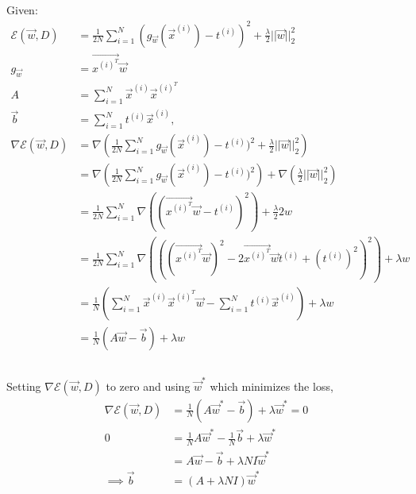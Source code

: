 \documentclass{article}
\begin{document}
{\subsection{}
Given:
\begin{align*}
\mathcal{E}(\vec{w}, D) &= \frac{1}{2N} \sum_{i=1}^N (g_{\vec{w}} (\vec{x}^{(i)}) - t^{(i)} )^2 + \frac{\lambda}{2} || \vec{w} || _2^2 \\
g_{\vec{w}} &= \vec{x^{(i)^T}} \vec{w} \\
A &= \sum_{i=1}^N \vec{x}^{(i)}   \vec{x}^{(i)^T} \\
\vec{b} &= \sum_{i=1}^N t^{(i)} \vec{x}^{(i)} \text{,} \\
\nabla \mathcal{E}(\vec{w}, D) &= \nabla \left( \frac{1}{2N} \sum_{i=1}^N g_{\vec{w}} (\vec{x}^{(i)}) - t^{(i)} )^2 + \frac{\lambda}{2} || \vec{w} || _2^2 \right) \\
&= \nabla \left( \frac{1}{2N} \sum_{i=1}^N g_{\vec{w}} (\vec{x}^{(i)}) - t^{(i)} )^2 \right) + \nabla \left( \frac{\lambda}{2} || \vec{w} || _2^2 \right) \\
&=  \frac{1}{2N} \sum_{i=1}^N \nabla \left( (\vec{x^{(i)^T}} \vec{w} - t^{(i)} )^2 \right) + \frac{\lambda}{2} 2w \\
&=  \frac{1}{2N} \sum_{i=1}^N \nabla \left( ((\vec{x^{(i)^T}} \vec{w})^2 - 2 \vec{x^{(i)^T}} \vec{w} t^{(i)} + (t^{(i)})^2 )^2 \right) + \lambda w \\
&= \frac{1}{N} ( \sum_{i=1}^N \vec{x}^{(i)}   \vec{x}^{(i)^T} \vec{w} - \sum_{i=1}^N t^{(i)} \vec{x}^{(i)} ) + \lambda w \\
&= \frac{1}{N} (A \vec{w} - \vec{b}) + \lambda w
\end{align*}













\subsection{}
Setting $\nabla \mathcal{E} (\vec{w}, D)$ to zero and using $\vec{w}^*$ which minimizes the loss,
\begin{align*}
\nabla \mathcal{E} (\vec{w}, D) &=  \frac{1}{N} (A \vec{w}^* - \vec{b}) + \lambda \vec{w}^* = 0 \\
0 &= \frac{1}{N} A \vec{w}^* - \frac{1}{N} \vec{b} + \lambda \vec{w}^* \\
&= A \vec{w} - \vec{b} + \lambda N I \vec{w}^* \\
\implies \vec{b} &= (A + \lambda N I) \vec{w}^*
\end{align*}








}
\end{document}
